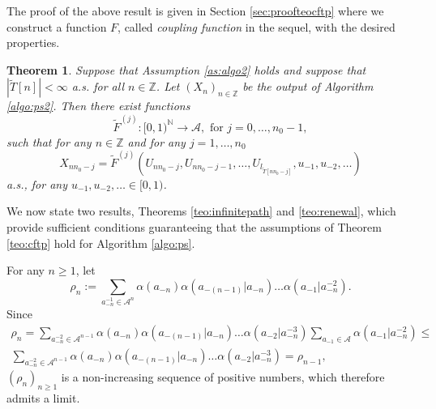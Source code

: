\documentclass[a4paper]{article}
\newtheorem{theorem}{Theorem}%
\newtheorem{proposition}{Proposition}%
\def\P{{\mathbb P}}
\newcommand{\Z}{\mathbb{Z}}
\newcommand{\N}{\mathbb{N}}
\renewcommand{\H}{\mathcal{H}}
\newcommand{\A}{\mathcal{A}}
\begin{document}
The proof of the above result is given in Section \ref{sec:proofteocftp} where we construct a function $F$, called {\it coupling function} in the sequel, with the desired properties.

\begin{theorem} \label{coro:cftp}
Suppose that Assumption \ref{as:algo2} holds and suppose that $|\tilde{T}[n]|<\infty$ a.s. for all $n\in \Z$.
Let $(X_n)_{n\in \Z}$ be the output of Algorithm \ref{algo:ps2}. Then there exist functions
$$
\tilde{F}^{(j)}: [0,1)^{\N} \to \A, \text{ for } j=0,\ldots, n_0-1,
$$
such that for any $n\in \Z$ and for any $j=1,\ldots,n_0 $
$$
X_{nn_0-j}=\tilde{F}^{(j)}(U_{nn_0-j},U_{nn_0-j-1}, \ldots, U_{l_{\tilde{T}[nn_0-j]}}, u_{-1},u_{-2},\ldots) %
$$
a.s., for any $u_{-1},u_{-2},\ldots \in [0,1)$. 
\end{theorem}

We now state two results, Theorems \ref{teo:infinitepath} and \ref{teo:renewal}, which provide sufficient conditions guaranteeing that the assumptions of Theorem \ref{teo:cftp} hold for Algorithm \ref{algo:ps}.

For any $n\geq 1$, let
\begin{equation} \label{def:rho}
\rho_n:=\sum_{a_{-n}^{-1}\in \A^n}\alpha(a_{-n})\alpha(a_{-(n-1)}|a_{-n})\ldots \alpha(a_{-1}|a_{-n}^{-2}).
\end{equation}
Since
\begin{multline*}
\rho_n=\sum_{a_{-n}^{-2}\in \A^{n-1}}\alpha(a_{-n})\alpha(a_{-(n-1)}|a_{-n})\ldots \alpha(a_{-2}|a_{-n}^{-3})\sum_{a_{-1}\in \A}\alpha(a_{-1}|a_{-n}^{-2})\leq \\ \sum_{a_{-n}^{-2}\in \A^{n-1}}\alpha(a_{-n})\alpha(a_{-(n-1)}|a_{-n})\ldots \alpha(a_{-2}|a_{-n}^{-3}) =\rho_{n-1},
\end{multline*}
 $(\rho_n)_{n\geq 1}$ is a non-increasing sequence of positive numbers, which therefore admits a limit.
\end{document}
